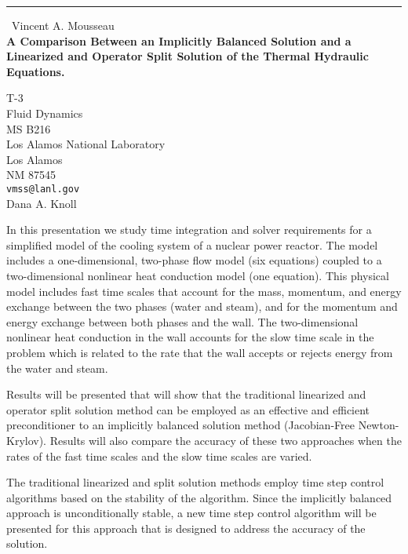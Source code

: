 \documentclass{report}
\begin{document}
\begin{center}
\rule{6in}{1pt} \
{\large Vincent A. Mousseau \\
{\bf A Comparison Between an Implicitly Balanced Solution and a Linearized and Operator Split Solution of the Thermal Hydraulic Equations.}}

T-3 \\ Fluid Dynamics \\ MS B216 \\ Los Alamos National Laboratory \\ Los Alamos \\ NM  87545
\\
{\tt vmss@lanl.gov}\\
Dana A. Knoll\end{center}

In this presentation we study time integration and solver requirements
for a simplified model of the cooling system of a nuclear power reactor.
The model includes a one-dimensional, two-phase flow model (six
equations) coupled to a two-dimensional nonlinear heat conduction model
(one equation). This physical model includes fast time scales that
account for the mass, momentum, and energy exchange between the two
phases (water and steam), and for the momentum and energy exchange
between both phases and the wall. The two-dimensional nonlinear heat
conduction in the wall accounts for the slow time scale in the problem
which is related to the rate that the wall accepts or rejects energy from
the water and steam.

Results will be presented that will show that the traditional linearized
and operator split solution method can be employed as an effective and
efficient preconditioner to an implicitly balanced solution method
(Jacobian-Free Newton-Krylov). Results will also compare the accuracy of
these two approaches when the rates of the fast time scales and the slow
time scales are varied.

The traditional linearized and split solution methods employ time step
control algorithms based on the stability of the algorithm. Since the
implicitly balanced approach is unconditionally stable, a new time step
control algorithm will be presented for this approach that is designed to
address the accuracy of the solution.
\end{document}
